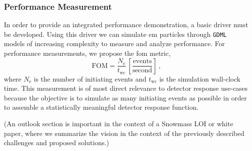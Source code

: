\documentclass[10pt]{article}
\begin{document}
\subsubsection*{Performance Measurement}

In order to provide an integrated performance demonstration, a basic driver must be developed. Using this driver we can
simulate \ac{em} particles through \texttt{GDML} models of increasing
complexity to measure and analyze performance. For performance
measurements, we propose the \ac{fom} metric, 
\begin{equation}
  \textrm{FOM} = \frac{N_\textrm{e}}{t_{\textrm{wc}}}\,
  \left[\frac{\textrm{events}}{\textrm{second}}\right]\:,
\end{equation}
where $N_\textrm{e}$ is the number of initiating events and
$t_\textrm{wc}$ is the simulation wall-clock time. This measurement is
of most direct relevance to detector response use-cases because the
objective is to simulate as many initiating events as possible in order
to assemble a statistically meaningful detector response function.

(An outlook section is important in the context of a Snowmass LOI or white paper, where we summarize the vision in the context of the previously described challenges and proposed solutions.)
\pagebreak
\printbibliography

\end{document}
